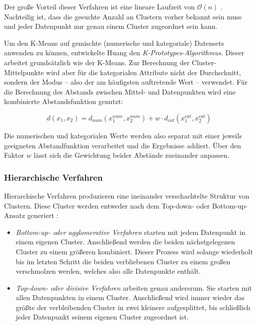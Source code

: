 Der große Vorteil dieser Verfahren ist eine lineare Laufzeit von
\(\mathcal{O}(n)\) \autocite{huang1998}. Nachteilig ist, dass die
gesuchte Anzahl an Clustern vorher bekannt sein muss und jeder
Datenpunkt nur genau einem Cluster zugeordnet sein kann. \autocite[Kap.
1.3.1 Partitioning Methods]{kaufman2009}

Um den K-Means auf gemischte (numerische und kategoriale) Datensets
anwenden zu können, entwickelte Huang \autocite{huang1998} den
\emph{K-Prototypes-Algorithmus}. Dieser arbeitet grundsätzlich wie der
K-Means. Zur Berechnung der Cluster-Mittelpunkte wird aber für die
kategorialen Attribute nicht der Durchschnitt, sondern der Modus -- also
der am häufigsten auftretende Wert -- verwendet. Für die Berechnung des
Abstands zwischen Mittel- und Datenpunkten wird eine kombinierte
Abstandsfunktion genutzt:

\begin{equation}
    d(x_1,x_2) = d_{num}(x^{num}_1,x^{num}_2) + w \cdot d_{cat}(x^{cat}_1,x^{cat}_2)
\end{equation}

Die numerischen und kategorialen Werte werden also separat mit einer
jeweils geeigneten Abstandfunktion verarbeitet und die Ergebnisse
addiert. Über den Faktor \(w\) lässt sich die Gewichtung beider Abstände
zueinander anpassen. \autocite{huang1998}

\hypertarget{hierarchische-verfahren}{%
\subsubsection{Hierarchische Verfahren}\label{hierarchische-verfahren}}

Hierarchische Verfahren produzieren eine ineinander verschachtelte
Struktur von Clustern. Diese Cluster werden entweder nach dem Top-down-
oder Bottom-up-Ansatz generiert \autocite[Kap. 1.3.2 Hierarchical
Methods]{kaufman2009}:

\begin{itemize}
\tightlist
\item
  \emph{Bottom-up- oder agglomerative Verfahren} starten mit jedem
  Datenpunkt in einem eigenen Cluster. Anschließend werden die beiden
  nächstgelegenen Cluster zu einem größeren kombiniert. Dieser Prozess
  wird solange wiederholt bis im letzten Schritt die beiden verbliebenen
  Cluster zu einem großen verschmolzen werden, welches also alle
  Datenpunkte enthält.
\item
  \emph{Top-down- oder divisive Verfahren} arbeiten genau andersrum. Sie
  starten mit allen Datenpunkten in einem Cluster. Anschließend wird
  immer wieder das größte der verbleibenden Cluster in zwei kleinere
  aufgesplittet, bis schließlich jeder Datenpunkt seinem eigenen Cluster
  zugeordnet ist.
\end{itemize}

